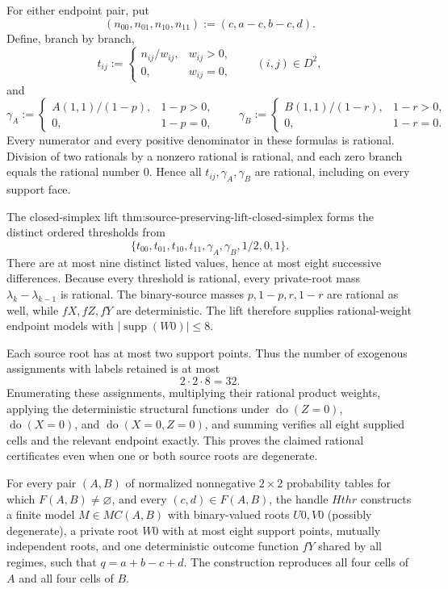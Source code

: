 For either endpoint pair, put
\[
(n_{00},n_{01},n_{10},n_{11}):=(c,a-c,b-c,d).
\]
Define, branch by branch,
\[
t_{ij}:=
\begin{cases}
n_{ij}/w_{ij},&w_{ij}>0,\\
0,&w_{ij}=0,
\end{cases}
\qquad (i,j)\in D^2,
\]
and
\[
\gamma_A:=
\begin{cases}
A(1,1)/(1-p),&1-p>0,\\
0,&1-p=0,
\end{cases}
\qquad
\gamma_B:=
\begin{cases}
B(1,1)/(1-r),&1-r>0,\\
0,&1-r=0.
\end{cases}
\]
Every numerator and every positive denominator in these formulas is rational.  Division of two rationals by a nonzero rational is rational, and each zero branch equals the rational number \(0\).  Hence all \(t_{ij},\gamma_A,\gamma_B\) are rational, including on every support face.

The closed-simplex lift \(\text{thm:source-preserving-lift-closed-simplex}\) forms the distinct ordered thresholds from
\[
\{t_{00},t_{01},t_{10},t_{11},\gamma_A,\gamma_B,1/2,0,1\}.
\]
There are at most nine distinct listed values, hence at most eight successive differences.  Because every threshold is rational, every private-root mass \(\lambda_k-\lambda_{k-1}\) is rational.  The binary-source masses \(p,1-p,r,1-r\) are rational as well, while \(fX,fZ,fY\) are deterministic.  The lift therefore supplies rational-weight endpoint models with \(|\operatorname{supp}(W0)|\le8\).

Each source root has at most two support points.  Thus the number of exogenous assignments with labels retained is at most
\[
2\cdot2\cdot8=32.
\]
Enumerating these assignments, multiplying their rational product weights, applying the deterministic structural functions under \(\operatorname{do}(Z=0)\), \(\operatorname{do}(X=0)\), and \(\operatorname{do}(X=0,Z=0)\), and summing verifies all eight supplied cells and the relevant endpoint exactly.  This proves the claimed rational certificates even when one or both source roots are degenerate.

For every pair \((A,B)\) of normalized nonnegative \(2\times2\) probability tables for which \(F(A,B)\ne\varnothing\), and every \((c,d)\in F(A,B)\), the handle \(Hthr\) constructs a finite model \(M\in MC(A,B)\) with binary-valued roots \(U0,V0\) (possibly degenerate), a private root \(W0\) with at most eight support points, mutually independent roots, and one deterministic outcome function \(fY\) shared by all regimes, such that \(q=a+b-c+d\).  The construction reproduces all four cells of \(A\) and all four cells of \(B\).


